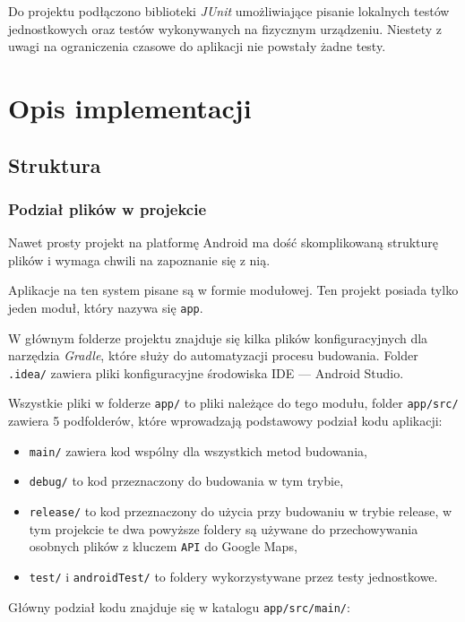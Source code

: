 \documentclass[polish,polish,a4paper,12pt]{article}
\let\sectioncmd\section
\renewcommand{\section}{\clearpage\sectioncmd}
\begin{document}
	Do projektu podłączono biblioteki \textit{JUnit} umożliwiające pisanie lokalnych testów jednostkowych oraz testów wykonywanych na fizycznym urządzeniu. Niestety z uwagi na ograniczenia czasowe do aplikacji nie powstały żadne testy.

\section{Opis implementacji}\label{implementation}
	\subsection{Struktura}
		\subsubsection{Podział plików w projekcie}

		Nawet prosty projekt na platformę Android ma dość skomplikowaną strukturę plików i wymaga chwili na zapoznanie się z nią.

		Aplikacje na ten system pisane są w formie modułowej. Ten projekt posiada tylko jeden moduł, który nazywa się \texttt{app}.

		W głównym folderze projektu znajduje się kilka plików konfiguracyjnych dla narzędzia \textit{Gradle}, które służy do automatyzacji procesu budowania. Folder \texttt{.idea/} zawiera pliki konfiguracyjne środowiska IDE — Android Studio.

		Wszystkie pliki w folderze \texttt{app/} to pliki należące do tego modułu, folder \texttt{app/src/} zawiera 5 podfolderów, które wprowadzają podstawowy podział kodu aplikacji:

		\begin{itemize}
			\item \texttt{main/} zawiera kod wspólny dla wszystkich metod budowania,
			\item \texttt{debug/} to kod przeznaczony do budowania w tym trybie,
			\item \texttt{release/} to kod przeznaczony do użycia przy budowaniu w trybie release, w tym projekcie te dwa powyższe foldery są używane do przechowywania osobnych plików z kluczem \texttt{API} do Google Maps,
			\item \texttt{test/} i \texttt{androidTest/} to foldery wykorzystywane przez testy jednostkowe.
		\end{itemize}

		Główny podział kodu znajduje się w katalogu \texttt{app/src/main/}:
\end{document}
